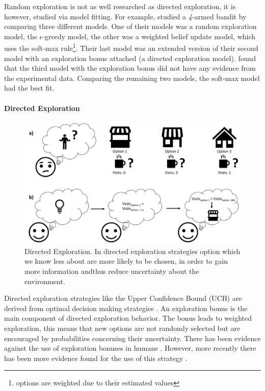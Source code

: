 Random exploration is not as well researched as directed exploration, it is however, studied via model fitting.  
For example, \cite{daw2006cortical} studied a \textit{4}-armed bandit by comparing three different models. One of their models was a random exploration model, the $\epsilon$-greedy model, the other was a weighted belief update model, which uses the soft-max rule\footnote{options are weighted due to their estimated values}. Their last model was an extended version of their second model with an exploration bonus attached (a directed exploration model). \citeauthor{daw2006cortical} found that the third model with the exploration bonus did not have any evidence from the experimental data. Comparing the remaining two models, the soft-max model had the best fit. 

\paragraph{Directed Exploration}
\begin{figure}
    \centering
    \includegraphics[width=1\textwidth]{Plots/DirectedExploration.pdf}
    \caption[Directed Exploration.]{Directed Exploration. In directed exploration strategies option which we know less about are more likely to be chosen, in order to gain more information andthus reduce uncertainty about the environment.}
    \label{fig:DirectedExploration}
\end{figure}
Directed exploration strategies like the Upper Confidence Bound (UCB) are derived from optimal decision making strategies \citep{wilson2014humans}. An exploration bonus is the main component of directed exploration behavior. The bonus leads to weighted exploration, this means that new options are not randomly selected but are encouraged by probabilities concerning their uncertainty. There has been evidence against the use of exploration bonuses in humans \citep{daw2006cortical}. However, more recently there has been more evidence found for the use of this strategy \citep{wilson2014humans, gershman2018deconstructing,knox2012nature, steyvers2009bayesian}.    

